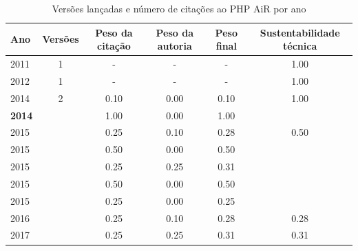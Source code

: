 \begin{table}[H]
\caption{Versões lançadas e número de citações ao PHP AiR por ano}
\centering
\begin{tabular}{| l | c | c | c | c | c |}
  \hline
  Ano & Versões & Peso da citação & Peso da autoria & Peso final & Sustentabilidade técnica \\
  \hline
        2011 & 1 & - & - & -
        &
          {\color{blue} 1.00}
        \\
\hline
        2012 & 1 & - & - & -
        &
          {\color{blue} 1.00}
        \\
\hline
            2014
          &
          2
          &
          0.10
          &
          0.00
          &
          0.10
          &
            {\color{blue} 1.00}
          \\
            {\bf 2014}
          &
          
          &
          1.00
          &
          0.00
          &
          1.00
          &
          \\
\hline
            2015
          &
          
          &
          0.25
          &
          0.10
          &
          0.28
          &
            {\color{blue} 0.50}
          \\
            2015
          &
          
          &
          0.50
          &
          0.00
          &
          0.50
          &
          \\
            2015
          &
          
          &
          0.25
          &
          0.25
          &
          0.31
          &
          \\
            2015
          &
          
          &
          0.50
          &
          0.00
          &
          0.50
          &
          \\
            2015
          &
          
          &
          0.25
          &
          0.00
          &
          0.25
          &
          \\
\hline
            2016
          &
          
          &
          0.25
          &
          0.10
          &
          0.28
          &
            {\color{red} 0.28}
          \\
\hline
            2017
          &
          
          &
          0.25
          &
          0.25
          &
          0.31
          &
            {\color{red} 0.31}
          \\
\hline
\end{tabular}
\end{table}

